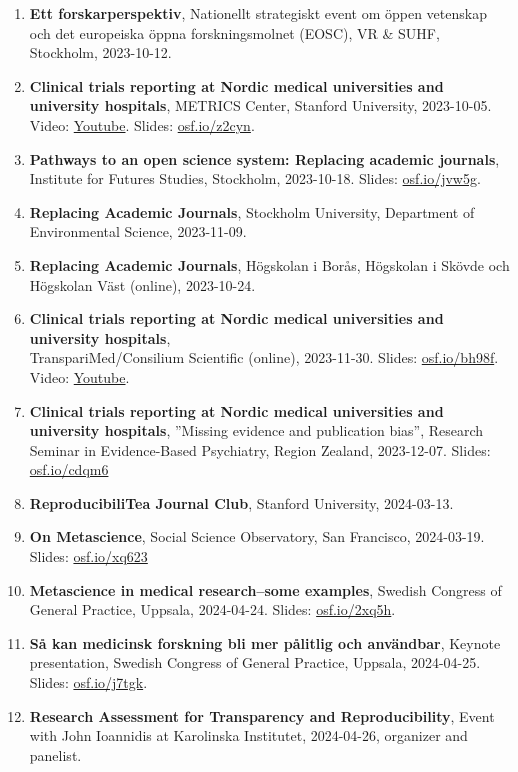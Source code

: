\documentclass[10pt]{article}
\begin{document}
\begin{enumerate}[nolistsep]
\item \textbf{Ett forskarperspektiv}, Nationellt strategiskt event om öppen vetenskap och det europeiska öppna forskningsmolnet (EOSC), VR \& SUHF, Stockholm, 2023-10-12. 
\item \textbf{Clinical trials reporting at Nordic medical universities and university hospitals}, METRICS Center, Stanford University, 2023-10-05. Video: \href{https://www.youtube.com/watch?v=RoYXvmG0KN0}{Youtube}. Slides: \href{https://osf.io/z2cyn}{osf.io/z2cyn}.
\item \textbf{Pathways to an open science system: Replacing academic journals}, Institute for Futures Studies, Stockholm, 2023-10-18. Slides: \href{https://osf.io/jvw5g}{osf.io/jvw5g}.
\item \textbf{Replacing Academic Journals}, Stockholm University, Department of Environmental Science, 2023-11-09.
\item \textbf{Replacing Academic Journals}, Högskolan i Borås, Högskolan i Skövde och Högskolan Väst (online), 2023-10-24.
\item \textbf{Clinical trials reporting at Nordic medical universities and university hospitals}, \\TranspariMed/Consilium Scientific (online), 2023-11-30. Slides: \href{https://osf.io/bh98f}{osf.io/bh98f}. Video: \href{https://www.youtube.com/watch?v=GBNQbQvYzjc}{Youtube}.
\item \textbf{Clinical trials reporting at Nordic medical universities and university hospitals}, ”Missing evidence and publication bias”, Research Seminar in Evidence-Based Psychiatry, Region Zealand, 2023-12-07. Slides: \href{https://osf.io/cdqm6}{osf.io/cdqm6}
\item \textbf{ReproducibiliTea Journal Club}, Stanford University, 2024-03-13.
\item \textbf{On Metascience}, Social Science Observatory, San Francisco, 2024-03-19. Slides: \href{https://osf.io/xq623}{osf.io/xq623}
\item \textbf{Metascience in medical research–some examples}, Swedish Congress of General Practice, Uppsala, 2024-04-24. Slides: \href{https://osf.io/2xq5h}{osf.io/2xq5h}. 
\item \textbf{Så kan medicinsk forskning bli mer pålitlig och användbar}, Keynote presentation, Swedish Congress of General Practice, Uppsala, 2024-04-25. Slides: \href{https://osf.io/j7tgk}{osf.io/j7tgk}. 
\item \textbf{Research Assessment for Transparency and Reproducibility}, Event with John Ioannidis at Karolinska Institutet, 2024-04-26, organizer and panelist.

\end{enumerate}
\end{document}

